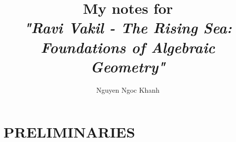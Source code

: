\documentclass{report}
\title{
	My notes for \\ 
	\textit{"Ravi Vakil - The Rising Sea: Foundations of Algebraic Geometry"}
}
\author{Nguyen Ngoc Khanh}
\begin{document}
\maketitle

\tableofcontents

\chapter{PRELIMINARIES}



\end{document}
